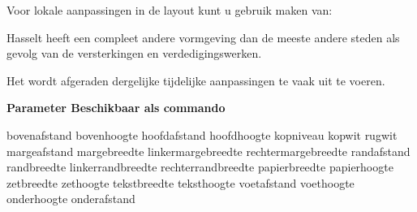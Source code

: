 Voor lokale aanpassingen in de layout kunt u gebruik maken
van:


\startbuffer
\start

\startlokaal
  \stellayoutin[hoogte=+.5cm]
\stoplokaal

Hasselt heeft een compleet andere vormgeving dan de meeste
andere steden als gevolg van de versterkingen en
verdedigingswerken.

\stop
\stopbuffer

\typebuffer

Het wordt afgeraden dergelijke tijdelijke aanpassingen te
vaak uit te voeren.

\startbuffer
\starttabelkop
\HL
\NC \bf Parameter        \NC \bf Beschikbaar als commando \NC\SR
\HL
\stoptabelkop

\starttabelstaart
\HL
\stoptabelstaart

\starttabellen[|l|l|]
\NC bovenafstand         \NC \type{\bovenafstand}        \NC\FR
\NC bovenhoogte          \NC \type{\bovenhoogte}         \NC\MR
\NC hoofdafstand         \NC \type{\hoofdafstand}        \NC\MR
\NC hoofdhoogte          \NC \type{\hoofdhoogte}         \NC\MR
\NC kopniveau            \NC \type{\kopniveau}           \NC\MR
\NC kopwit               \NC \type{\kopwit}              \NC\MR
\NC rugwit               \NC \type{\rugwit}              \NC\MR
\NC margeafstand         \NC \type{\margeafstand}        \NC\MR
\NC margebreedte         \NC \type{\margebreedte}        \NC\MR
\NC linkermargebreedte   \NC \type{\linkermargebreedte}  \NC\MR
\NC rechtermargebreedte  \NC \type{\rechtermargebreedte} \NC\MR
\NC randafstand          \NC \type{\randafstand}         \NC\MR
\NC randbreedte          \NC \type{\randbreedte}         \NC\MR
\NC linkerrandbreedte    \NC \type{\linkerrandbreedte}   \NC\MR
\NC rechterrandbreedte   \NC \type{\rechterrandbreedte}  \NC\MR
\NC papierbreedte        \NC \type{\papierbreedte}       \NC\MR
\NC papierhoogte         \NC \type{\papierhoogte}        \NC\MR
\NC zetbreedte           \NC \type{\zetbreedte}          \NC\MR
\NC zethoogte            \NC \type{\zethoogte}           \NC\MR
\NC tekstbreedte         \NC \type{\tekstbreedte}        \NC\MR
\NC teksthoogte          \NC \type{\teksthoogte}         \NC\MR
\NC voetafstand          \NC \type{\voetafstand}         \NC\MR
\NC voethoogte           \NC \type{\voethoogte}          \NC\MR
\NC onderhoogte          \NC \type{\onderhoogte}         \NC\MR
\NC onderafstand         \NC \type{\onderafstand}        \NC\LR
\stoptabellen
\stopbuffer

  {\haalbuffer}

\stoponderdeel
